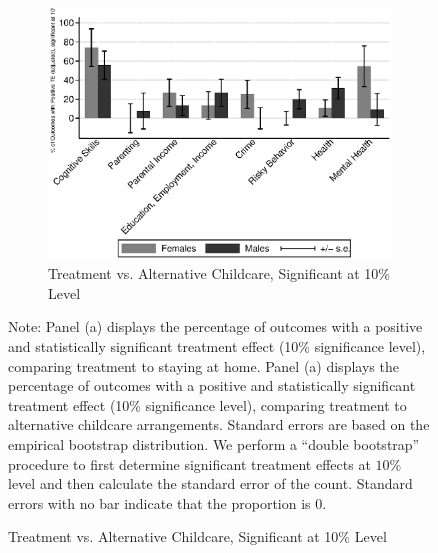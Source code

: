 \begin{figure}[H]
\begin{subfigure}[h]{0.7\textwidth}
	\centering
	\caption{Treatment vs. Alternative Childcare, Significant at 10\% Level}
		\includegraphics[width=\textwidth]{output/epan_ipw_p1_cats1_sig10.eps}
\end{subfigure}
\scriptsize \justify
Note: Panel (a) displays the percentage of outcomes with a positive and statistically significant treatment effect (10\% significance level), comparing treatment to staying at home. Panel (a) displays the percentage of outcomes with a positive and statistically significant treatment effect (10\% significance level), comparing treatment to alternative childcare arrangements. Standard errors are based on the empirical bootstrap distribution. We perform a ``double bootstrap'' procedure to first determine significant treatment effects at $10\%$ level and then calculate the standard error of the count. Standard errors with no bar indicate that the proportion is 0. \\
\end{figure}

